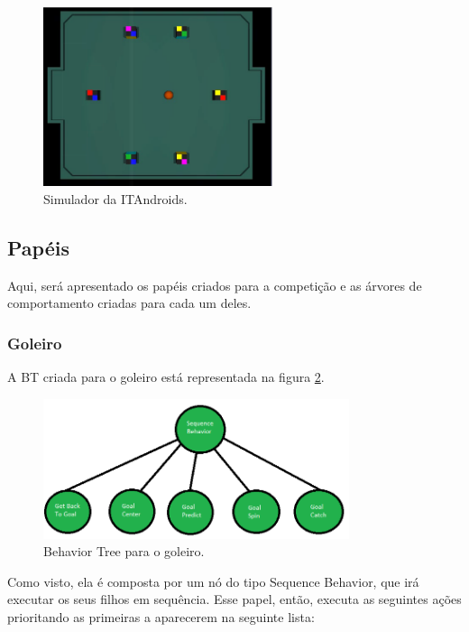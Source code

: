 \documentclass[a4paper,12pt]{article}
\begin{document}
\begin{figure}[H]
	\centering
	\includegraphics[width=0.6\textwidth]{figures/SimulatorWithoutButtons.png}
	\caption{Simulador da ITAndroids.}
	\label{fig:simulator}
\end{figure}

\subsection{Papéis}

Aqui, será apresentado os papéis criados para a competição e as árvores de comportamento criadas para cada um deles.

\subsubsection{Goleiro}

A BT criada para o goleiro está representada na figura \ref{fig:goalier_bt}.

\begin{figure}[H]
	\centering
	\includegraphics[width=0.8\textwidth]{figures/Goalier_BT.png}
   	\caption{Behavior Tree para o goleiro.} \label{fig:goalier_bt}
\end{figure}

Como visto, ela é composta por um nó do tipo Sequence Behavior, que irá executar os seus filhos em sequência. Esse papel, então, executa as seguintes ações prioritando as primeiras a aparecerem na seguinte lista:
\end{document}
